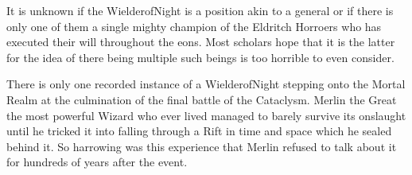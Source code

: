 {{It is unknown if the Wielder\minus{}of\minus{}Night is a position\comma{} akin to a general\comma{} or if there is only one of them\comma{} a single mighty champion of the Eldritch Horroers\comma{} who has executed their will throughout the eons. Most scholars hope that it is the latter\comma{} for the idea of there being multiple such beings is too horrible to even consider. 

There is only one recorded instance of a Wielder\minus{}of\minus{}Night stepping onto the Mortal Realm\comma{} at the culmination of the final battle of the Cataclysm. Merlin the Great\comma{} the most powerful Wizard who ever lived\comma{} managed to barely survive its onslaught\comma{} until he tricked it into falling through a Rift in time and space\comma{} which he sealed behind it. So harrowing was this experience\comma{} that Merlin refused to talk about it for hundreds of years after the event.}



}











